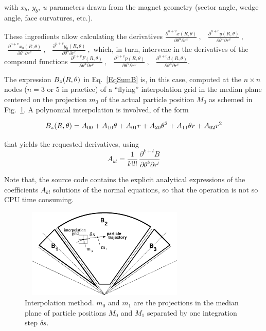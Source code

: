 \noindent with $x_b,~y_b,~u$ parameters drawn from the  magnet geometry (sector angle, wedge angle, face curvatures, etc.). 

\noindent These ingredients allow calculating  the derivatives 
$\frac{\partial^{ u+v}x(R,\theta)}{ \partial \theta^u\partial r^v}\:,$ 
$\:\: \frac{\partial^{ u+v}y(R,\theta)}{ \partial \theta^u\partial r^v}\:,$ 
$\:\:\frac{\partial^{ u+v}x_0(R,\theta)}{ \partial \theta^u\partial r^v}\:,$ 
$\:\:\frac{\partial^{ u+v}y_0(R,\theta)}{ \partial \theta^u\partial r^v}\:,$ 
which, in turn,  intervene in the derivatives of the compound functions 
$\frac{\partial^{ u+v}F(R,\theta)}{ \partial \theta^u\partial r^v}\:,$ 
$\:\:\frac{\partial^{ u+v}p(R,\theta)}{ \partial \theta^u\partial r^v}\:,$ 
$\:\:\frac{\partial^{ u+v}d(R,\theta)}{ \partial \theta^u\partial r^v}$. 


\bigskip


\bigskip

\noindent The expression ${B_z}(R,\theta)$ in Eq.~\ref{EqSumB} is, in this case, 
computed at  the $n\times n$ nodes  ($n=3$ or $5$ in practice)  
of a ``flying'' interpolation grid in the median plane centered on the projection $m_0$ of 
the actual particle position $M_0$ as schemed 
in Fig.~\ref{FigGrid}. A polynomial interpolation is involved, of the form 

$${B_z}(R,\theta) = A_{00} + A_{10}\theta + A_{01}r + A_{20}\theta^2 + A_{11}\theta r + A_{02}r^2 $$

\noindent  that yields the requested   derivatives, using 
$$	A_{kl} = \frac{1 }{ k!l!}\,  \frac{\partial^{ k+l}B }{ \partial \theta^k\partial r^l} $$

\noindent Note that, the source code contains the explicit analytical 
expressions of the coefficients $A_{kl}$ solutions of the normal 
equations, so that the operation is not so  CPU time consuming. 

\begin{figure}[h]
 \begin{center}
\includegraphics*[bbllx=30,bblly=150,bburx=590,bbury=400,width=8.2cm,height=4.3cm]{grid.eps}
  \caption{ \small     \label{FigGrid}
Interpolation method.  
$m_0$ and $m_1$ are the projections in the median plane of particle positions $M_0$ and $M_1$  separated 
by one integration step $\delta s$. 
}
  \end{center}
\end{figure}





